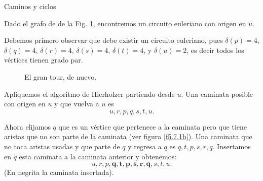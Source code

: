 \begin{section}{Caminos y ciclos}
\begin{comment}
    Observemos que el subgrafo formado por todas las aristas utilizadas despues de cada paso iterativo es un grafo con valencias pares y por lo tanto el subgrafo que obtenemos luego de quitar estas aristas también es par. Esto nos permite hacer caminatas cerradas  por aristas no utilizadas desde cada vértice con aristas no utilizadas.
\end{enumerate}

Puesto que suponemos que el grafo original es conexo, repetir el paso iterativo agotará todos las aristas del grafo.
\end{comment}

\begin{ejemplo*} Dado  el  grafo de de la  Fig. \ref{f5.7.1}, encontremos un circuito euleriano con origen en $u$. 

Debemos primero observar que  debe existir un circuito euleriano, pues $\delta(p)=4$, $\delta(q)=4$, $\delta(r)=4$, $\delta(s)=4$, $\delta(t)=4$, y $\delta(u)=2$,  es decir todos los vértices tienen grado par. 


\begin{figure}[ht]
    \begin{center}
    \end{center}
    \caption{El gran tour, de nuevo.} \label{f5.7.1}
\end{figure}

Apliquemos el algoritmo de Hierholzer partiendo  desde $u$. Una caminata posible con origen en $u$ y que vuelva a $u$ es $$u, r, p, q, s, t, u.$$


Ahora elijamos $q$ que es un vértice que pertenece a la caminata pero que tiene aristas que no son parte de la caminata (ver figura \ref{f5.7.1b}). Una caminata que no toca aristas usadas y  que parte de $q$ y regresa a $q$ es $q,t,p,s,r,q$.  
Insertamos en $q$  esta caminata  a la caminata anterior y obtenemos:
$$u, r, p, \mathbf{q,t,p,s,r,q}, s, t, u.$$
(En  negrita la caminata insertada).
\end{ejemplo*}



\end{section}
